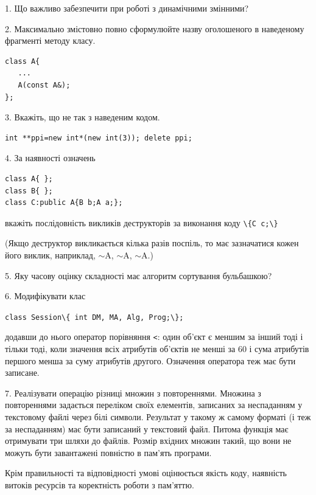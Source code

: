\documentclass[12pt, ukrainian]{article}
\def\code#1{\Verb!#1!}
\begin{document}
{%
1. Що важливо забезпечити при роботі з динамічними змінними?%
\par
\vspace{2mm}
2. Максимально змістовно повно сформулюйте назву оголошеного в наведеному фрагменті методу класу.
\vspace{-3mm}
\begin{verbatim}class A{
   ...
   A(const A&);
};\end{verbatim}
\vspace{-3mm}
\par
\vspace{2mm}
3. Вкажіть, що не так з наведеним кодом.
\vspace{-3mm}
\begin{verbatim}int **ppi=new int*(new int(3)); delete ppi;\end{verbatim}
\vspace{-3mm}
\par
\vspace{2mm}
4. За наявності означень
\vspace{-3mm}
\begin{verbatim}
class A{ };
class B{ };
class C:public A{B b;A a;};\end{verbatim}
\vspace{-3mm}
вкажіть послідовність викликів деструкторів за виконання коду \code{\{C c;\}} 

(Якщо деструктор викликається кілька разів поспіль, то має зазначатися кожен його виклик, наприклад, $\sim$A, $\sim$A, $\sim$A.)

\vspace{2mm}
5. Яку часову оцінку складності має алгоритм сортування бульбашкою?
\par
\vspace{2mm}
6. Модифікувати клас 

\qquad\code{class Session\{ int DM, MA, Alg, Prog;\};} 


додавши до нього оператор порівняння \code{<}: один об'єкт є меншим за інший тоді і тільки тоді, коли значення всіх атрибутів об'єктів не менші за 60 і сума атрибутів першого менша за суму атрибутів другого. Означення оператора теж має бути записане.%
\par
\vspace{2mm}
7. 
Реалізувати операцію різниці множин з повтореннями. Множина з повтореннями задається переліком своїх елементів, записаних за неспаданням у текстовому файлі через білі символи. Результат у такому ж самому форматі (і теж за неспаданням) має бути записаний у текстовий файл. Питома функція має отримувати три шляхи до файлів. Розмір вхідних множин такий, що вони не можуть бути завантажені повністю в пам’ять програми.

Крім правильності та відповідності умові оцінюється якість коду, наявність витоків ресурсів та коректність роботи з пам'яттю. 

}
\end{document}
